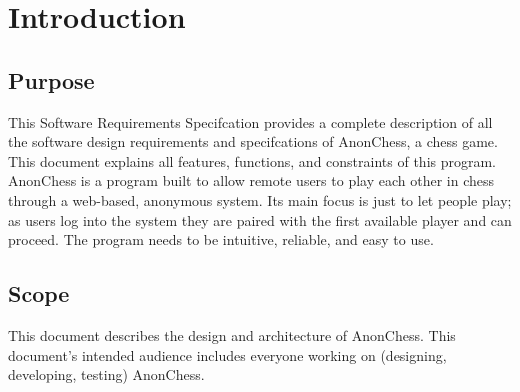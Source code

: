 \section{Introduction}

\subsection{Purpose}
This Software Requirements Specifcation provides a complete description of all the software design requirements and specifcations of AnonChess, a chess game. This document explains all features, functions, and constraints of this program.
AnonChess is a program built to allow remote users to play each other in chess through a web-based, anonymous system. Its main focus is just to let people play; as users log into the system they are paired with the first available player and can proceed. The program needs to be intuitive, reliable, and easy to use.
  
\subsection{Scope}
This document describes the design and architecture of AnonChess. This document’s intended audience includes everyone working on (designing, developing, testing) AnonChess.
